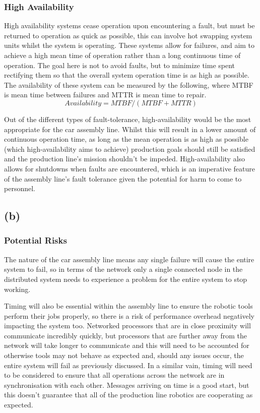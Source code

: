 \documentclass[]{report}
\begin{document}
				\subsubsection{High Availability}
				High availability systems cease operation upon encountering a fault, but must be returned to operation as quick as possible, this can involve hot swapping system units whilst the system is operating. These systems allow for failures, and aim to achieve a high mean time of operation rather than a long continuous time of operation. The goal here is not to avoid faults, but to minimize time spent rectifying them so that the overall system operation time is as high as possible\cite{gray1991high}. The availability of these system can be measured by the following, where MTBF is mean time between failures and MTTR is mean time to repair.
				\begin{equation*}
				Availability = MTBF/(MTBF + MTTR)
				\end{equation*}
				
				Out of the different types of fault-tolerance, high-availability would be the most appropriate for the car assembly line. Whilst this will result in a lower amount of continuous operation time, as long as the mean operation is as high as possible (which high-availability aims to achieve) production goals should still be satisfied and the production line's mission shouldn't be impeded. High-availability also allows for shutdowns when faults are encountered, which is an imperative feature of the assembly line's fault tolerance given the potential for harm to come to personnel.
			
			\subsection{(b)}
				\subsubsection{Potential Risks}
				The nature of the car assembly line means any single failure will cause the entire system to fail, so in terms of the network only a single connected node in the distributed system needs to experience a problem for the entire system to stop working. 
				
				Timing will also be essential within the assembly line to ensure the robotic tools perform their jobs properly, so there is a risk of performance overhead negatively impacting the system too. Networked processors that are in close proximity will communicate incredibly quickly, but processors that are further away from the network will take longer to communicate and this will need to be accounted for otherwise tools may not behave as expected and, should any issues occur, the entire system will fail as previously discussed. In a similar vain, timing will need to be considered to ensure that all operations across the network are in synchronisation with each other. Messages arriving on time is a good start, but this doesn't guarantee that all of the production line robotics are cooperating as expected.
				
\end{document}
